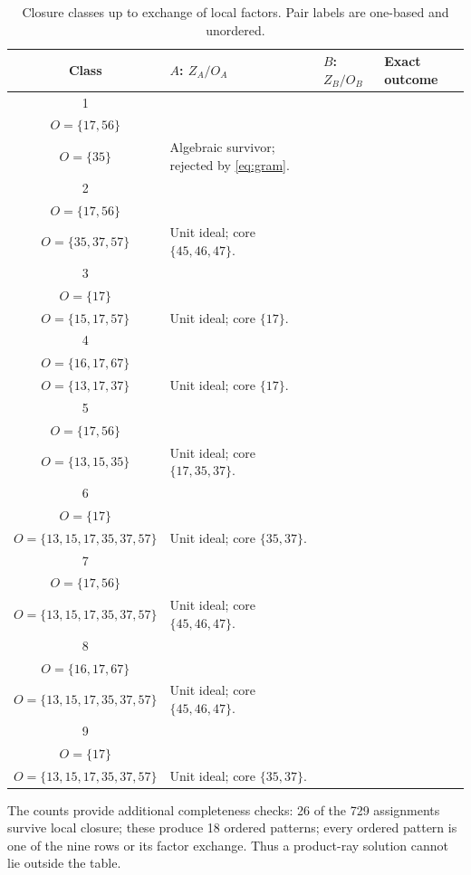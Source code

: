 \documentclass[11pt]{article}
\begin{document}
\begin{table}[H]
\centering
\scriptsize
\caption{Closure classes up to exchange of local factors.  Pair labels are
one-based and unordered.}
\label{tab:classes}
\begin{tabularx}{\textwidth}{@{}cXXX@{}}
\toprule
Class & $A$: $Z_A/O_A$ & $B$: $Z_B/O_B$ & Exact outcome \\
\midrule
1 & \shortstack[l]{$Z=\{15,16,57,67\}$\\$O=\{17,56\}$}
  & \shortstack[l]{$Z=\{36,56\}$\\$O=\{35\}$}
  & Algebraic survivor; rejected by \eqref{eq:gram}. \\
2 & \shortstack[l]{$Z=\{15,16,57,67\}$\\$O=\{17,56\}$}
  & \shortstack[l]{$Z=\{36,56,67\}$\\$O=\{35,37,57\}$}
  & Unit ideal; core $\{45,46,47\}$. \\
3 & \shortstack[l]{$Z=\{15,36,57\}$\\$O=\{17\}$}
  & \shortstack[l]{$Z=\{16,56,67\}$\\$O=\{15,17,57\}$}
  & Unit ideal; core $\{17\}$. \\
4 & \shortstack[l]{$Z=\{15,56,57\}$\\$O=\{16,17,67\}$}
  & \shortstack[l]{$Z=\{16,36,67\}$\\$O=\{13,17,37\}$}
  & Unit ideal; core $\{17\}$. \\
5 & \shortstack[l]{$Z=\{15,16,57,67\}$\\$O=\{17,56\}$}
  & \shortstack[l]{$Z=\{16,36,56\}$\\$O=\{13,15,35\}$}
  & Unit ideal; core $\{17,35,37\}$. \\
6 & \shortstack[l]{$Z=\{15,57\}$\\$O=\{17\}$}
  & \shortstack[l]{$Z=\{16,36,56,67\}$\\$O=\{13,15,17,35,37,57\}$}
  & Unit ideal; core $\{35,37\}$. \\
7 & \shortstack[l]{$Z=\{15,16,57,67\}$\\$O=\{17,56\}$}
  & \shortstack[l]{$Z=\{16,36,56,67\}$\\$O=\{13,15,17,35,37,57\}$}
  & Unit ideal; core $\{45,46,47\}$. \\
8 & \shortstack[l]{$Z=\{15,56,57\}$\\$O=\{16,17,67\}$}
  & \shortstack[l]{$Z=\{16,36,56,67\}$\\$O=\{13,15,17,35,37,57\}$}
  & Unit ideal; core $\{45,46,47\}$. \\
9 & \shortstack[l]{$Z=\{15,36,57\}$\\$O=\{17\}$}
  & \shortstack[l]{$Z=\{16,36,56,67\}$\\$O=\{13,15,17,35,37,57\}$}
  & Unit ideal; core $\{35,37\}$. \\
\bottomrule
\end{tabularx}
\end{table}

The counts provide additional completeness checks: 26 of the 729 assignments
survive local closure; these produce 18 ordered patterns; every ordered pattern
is one of the nine rows or its factor exchange.  Thus a product-ray solution
cannot lie outside the table.



\end{document}
